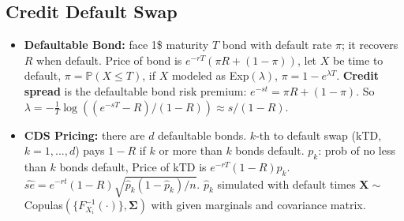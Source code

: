 \documentclass[9pt, landscape]{article}
\begin{document}
\begin{multicols*}{3}
\section{Credit Default Swap}
\begin{itemize}
	\item \textbf{Defaultable Bond:} face 1\$ maturity $T$ bond with default rate $\pi$; it recovers $R$ when default. Price of bond is $e^{-rT}(\pi R + (1-\pi))$, let $X$ be time to default, $\pi = \mathbb{P}(X\leq T)$, if $X$ modeled as Exp$(\lambda)$, $\pi = 1-e^{\lambda T}$. \textbf{Credit spread} is the defaultable bond risk premium: $e^{-st} = \pi R + (1-\pi)$. So $\lambda = -\frac{1}{T}\log((e^{-sT}-R)/(1-R))\approx s/(1-R)$.
	\item \textbf{CDS Pricing:} there are $d$ defaultable bonds. $k$-th to default swap (kTD, $k=1,...,d$) pays $1-R$ if $k$ or more than $k$ bonds default. $p_k$: prob of no less than $k$ bonds default, Price of kTD is $e^{-rT}(1-R)p_k$. $\widehat{se}=e^{-rt}(1-R)\sqrt{\widehat{p}_k(1-\widehat{p}_k)/n}$. $\widehat{p}_k$ simulated with default times $\bm{X}\sim$ Copulas$(\{F^{-1}_{X_i}(\cdot)\}, \bm{\Sigma})$ with given marginals and covariance matrix.
\end{itemize}

\end{multicols*}
\end{document}
